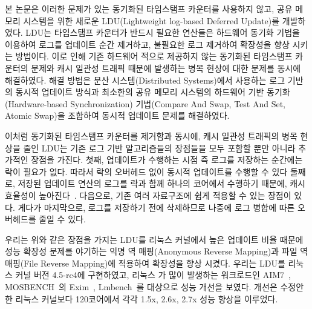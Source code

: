%
본 논문은 이러한 문제가 있는 동기화된 타임스탬프 카운터를 사용하지 않고,
공유 메모리 시스템을 위한 새로운 LDU(Lightweight log-based Deferred Update)를 개발하였다.
LDU는 타임스탬프 카운터가 반드시 필요한 연산들은 하드웨어 동기화 기법을 이용하여 
로그를 업데이트 순간 제거하고, 불필요한 로그 제거하여 확장성을 향상 시키는 방법이다.
이로 인해 기존 하드웨어 적으로 제공하지 않는 동기화된 타임스탬프 카운터의 문제와 
캐시 일관성 트래픽 때문에 발생하는 병목 현상에 대한 문제를 동시에 해결하였다.
해결 방법은 분산 시스템(Distributed Systems)에서 사용하는 로그 기반의 
동시적 업데이트 방식과 최소한의 공유 메모리 시스템의 하드웨어 기반 동기화(Hardware-based
Synchronization) 기법(Compare And Swap, Test And Set, Atomic Swap)을 조합하여 동시적 업데이트
문제를 해결하였다.

이처럼 동기화된 타임스탬프 카운터를 제거함과 동시에, 캐시 일관성 트래픽의 병목 현상을 줄인
LDU는 기존 로그 기반 알고리즘들의 장점들을 모두 포함할 뿐만 아니라 추가적인 장점을 가진다.
첫째, 업데이트가 수행하는 시점 즉 로그를 저장하는 순간에는 락이 필요가 없다.
따라서 락의 오버헤드 없이 동시적 업데이트를 수행할 수 있다
둘째로, 저장된 업데이트 연산의 로그를 락과 함께 하나의 코어에서 수행하기 때문에, 
캐시 효율성이 높아진다~\cite{Hendler2010FC}.
다음으로, 기존 여러 자료구조에 쉽게 적용할 수 있는 장점이 있다.
게다가 마지막으로, 로그를 저장하기 전에 삭제하므로 나중에 로그 병합에 따른 오버헤드를 
줄일 수 있다. 

우리는 위와 같은 장점을 가지는 LDU를 리눅스 커널에서 높은 업데이트 비율 때문에 성능 확장성 
문제를 야기하는 익명 역 매핑(Anonymous Reverse Mapping)과 파일 역 매핑(File Reverse Mapping)에
적용하여 확장성을 향상 시켰다.
우리는 LDU를 리눅스 커널 버전 4.5-rc4에 구현하였고, 리눅스 가 많이 발생하는 워크로드인
AIM7~\cite{AIM7Benchmark}, MOSBENCH~\cite{MOSBENCH}의 Exim~\cite{Exim}, Lmbench~\cite{mcvoy1996lmbench}를 
대상으로 성능 개선을 보였다.
개선은 수정안 한 리눅스 커널보다 120코어에서 각각 1.5x, 2.6x, 2.7x 성능 향상을 이루었다.

